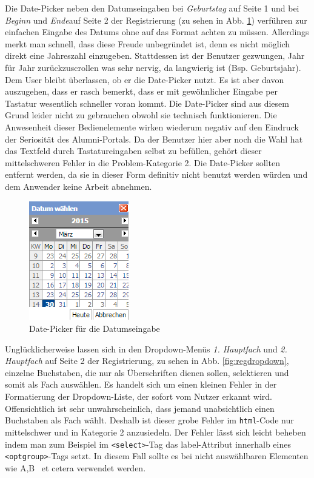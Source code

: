 {Die Date-Picker neben den Datumseingaben bei \emph{Geburtstag} auf Seite 1 und bei \emph{Beginn} und \emph{Ende}auf Seite 2 der Registrierung (zu sehen in Abb. \ref{fig:regdatepick}) verführen zur einfachen Eingabe des Datums ohne auf das Format achten zu müssen. Allerdings merkt man schnell, dass diese Freude unbegründet ist, denn es nicht möglich direkt eine Jahreszahl einzugeben. Stattdessen ist der Benutzer gezwungen, Jahr für Jahr zurückzuscrollen was sehr nervig, da langwierig ist (Bsp. Geburtsjahr).
}
{Dem User bleibt überlassen, ob er die Date-Picker nutzt. Es ist aber davon auszugehen, dass er rasch bemerkt, dass er mit gewöhnlicher Eingabe per Tastatur wesentlich schneller voran kommt. Die Date-Picker sind aus diesem Grund leider nicht zu gebrauchen obwohl sie technisch funktionieren. Die Anwesenheit dieser Bedienelemente wirken wiederum negativ auf den Eindruck der Seriosität des Alumni-Portals. Da der Benutzer hier aber noch die Wahl hat das Textfeld durch Tastatureingaben selbst zu befüllen, gehört dieser mittelschweren Fehler in die Problem-Kategorie 2.
}
{Die Date-Picker sollten entfernt werden, da sie in dieser Form definitiv nicht benutzt werden würden und dem Anwender keine Arbeit abnehmen.
}
\label{prob:reg:uselesspickerz}

\begin{figure}
	\centering
		\includegraphics{figures/datepicker.png}
	\caption{Date-Picker für die Datumseingabe}
	\label{fig:regdatepick}
\end{figure}

{Unglücklicherweise lassen sich in den Dropdown-Menüs \emph{1. Hauptfach} und \emph{2. Hauptfach} auf Seite 2 der Registrierung, zu sehen in Abb. \ref{fig:regdropdown}, einzelne Buchstaben, die nur als Überschriften dienen sollen, selektieren und somit als Fach auswählen. 
}
{Es handelt sich um einen kleinen Fehler in der Formatierung der Dropdown-Liste, der sofort vom Nutzer erkannt wird. Offensichtlich ist sehr unwahrscheinlich, dass jemand unabsichtlich einen Buchstaben als Fach wählt. Deshalb ist dieser grobe Fehler im \texttt{html}-Code nur mittelschwer und in Kategorie 2 anzusiedeln.
}
{Der Fehler lässt sich leicht beheben indem man zum Beispiel im \texttt{\textless select\textgreater}-Tag das label-Attribut innerhalb eines \texttt{\textless optgroup\textgreater}-Tags setzt. In diesem Fall sollte es bei nicht auswählbaren Elementen wie \glqq A\grqq,\glqq B\grqq~ et cetera verwendet werden.
} 
\label{prob:reg:buchstabe}

